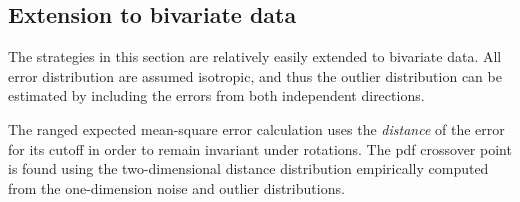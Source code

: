 \documentclass[10pt,journal]{IEEEtran}
\begin{document}
\subsection{Extension to bivariate data}
\label{sec:robust_bivariate}

The strategies in this section are relatively easily extended to bivariate data. All error distribution are assumed isotropic, and thus the outlier distribution can be estimated by including the errors from both independent directions.

The ranged expected mean-square error calculation uses the \emph{distance} of the error for its cutoff in order to remain invariant under rotations. The pdf crossover point is found using the two-dimensional distance distribution empirically computed from the one-dimension noise and outlier distributions.



\end{document}
